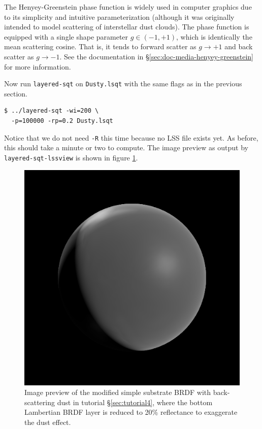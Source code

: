 \documentclass[
    twoside,
    twocolumn,
    letterpaper,
    10pt]{article}
\begin{document}
The Henyey-Greenstein phase function is widely used in computer graphics
due to its simplicity and intuitive parameterization (although it was 
originally intended to model scattering of interstellar dust clouds). The
phase function is equipped with a single shape parameter $g \in (-1, +1)$,
which is identically the mean scattering cosine. That is, it tends to
forward scatter as $g \to +1$ and back scatter as $g \to -1$. See the
documentation in \S\ref{sec:doc-media-henyey-greenstein} for more
information.

Now run \texttt{layered-sqt} on \texttt{Dusty.lsqt} with the same flags as in
the previous section.
\begin{verbatim}
$ ../layered-sqt -wi=200 \
  -p=100000 -rp=0.2 Dusty.lsqt
\end{verbatim}
Notice that we do not need \texttt{-R} this time because no LSS file 
exists yet. As before, this should take a minute or two to compute.
The image preview as output by \texttt{layered-sqt-lssview} is shown in
figure \ref{fig:tutorial4}.

\begin{figure}
\begin{center}
    \includegraphics[width=0.75\columnwidth]{tutorial4.png}
    \caption{Image preview of the modified simple substrate BRDF with 
    back-scattering
    dust in tutorial \S\ref{sec:tutorial4}, where the bottom Lambertian BRDF 
    layer is reduced to 20\% reflectance to exaggerate the dust effect.
    \label{fig:tutorial4}}
\end{center}
\end{figure}
\end{document}
